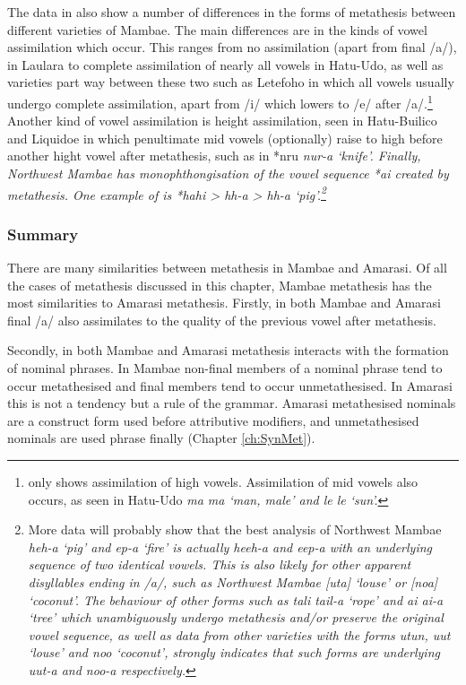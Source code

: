 The data in  also show a number of differences
in the forms of metathesis between different varieties of Mambae.
The main differences are in the kinds of vowel assimilation which occur.
This ranges from no assimilation (apart from final /a/),
in Laulara to complete assimilation of nearly all vowels in Hatu-Udo,
as well as varieties part way between these two such as Letefoho in which
all vowels usually undergo complete assimilation,
apart from /i/ which lowers to /e/ after /a/.\footnote{
		 only shows assimilation of high vowels.
		Assimilation of mid vowels also occurs, as seen in Hatu-Udo
		\it{ma} {\ra} \it{ma} `man, male' and
		\it{le} {\ra} \it{le} `sun'.}
Another kind of vowel assimilation is
height assimilation, seen in Hatu-Builico
and Liquidoe in which penultimate mid vowels
(optionally) raise to high before another hight vowel
after metathesis, such as in *nru {\ra} \it{nur-a} `knife'.
Finally, Northwest Mambae has monophthongisation
of the vowel sequence *ai created by metathesis.
One example of is *hahi > \it{hh-a} > \it{hh-a} `pig'.\footnote{
		More data will probably show that the best analysis of
		Northwest Mambae \it{heh-a} `pig' and \it{ep-a} `fire'
		is actually \it{heeh-a} and \it{eep-a} with an underlying sequence of two identical vowels.
		This is also likely for other apparent disyllables ending in /a/,
		such as Northwest Mambae [uta] `louse' or [noa] `coconut'.
		The behaviour of other forms such as \it{tali} {\ra} \it{tail-a} `rope'
		and  \it{ai} {\ra} \it{ai-a} `tree' which unambiguously undergo metathesis and/or
		preserve the original vowel sequence,
		as well as data from other varieties with the forms
		\it{utun}, \it{uut} `louse' and \it{noo} `coconut',
		strongly indicates that such forms
		are underlying \it{uut-a} and \it{noo-a} respectively.}

\subsubsection{Summary}
There are many similarities between metathesis in Mambae and Amarasi.
Of all the cases of metathesis discussed in this chapter,
Mambae metathesis has the most similarities to Amarasi metathesis.
Firstly, in both Mambae and Amarasi final /a/ also assimilates to the quality
of the previous vowel after metathesis.

Secondly, in both Mambae and Amarasi metathesis interacts
with the formation of nominal phrases.
In Mambae non-final members of a nominal phrase tend to occur metathesised
and final members tend to occur unmetathesised.
In Amarasi this is not a tendency but a rule of the grammar.
Amarasi metathesised nominals are a construct form used before attributive modifiers,
and unmetathesised nominals are used phrase finally (Chapter \ref{ch:SynMet}).

